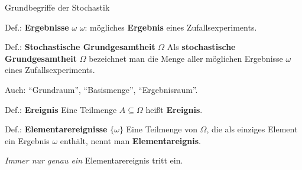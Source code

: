 \documentclass[
  10pt,
  ignorenonframetext,
]{beamer}
\begin{document}
\begin{frame}{Grundbegriffe der Stochastik}
\protect\hypertarget{grundbegriffe-der-stochastik}{}
\begin{block}{Def.: \textbf{Ergebnisse} \(\omega\)}
\protect\hypertarget{def.-ergebnisse-omega}{}
\(\omega\): mögliches \textbf{Ergebnis} eines Zufallsexperiments.
\end{block}

\begin{block}{Def.: \textbf{Stochastische Grundgesamtheit} \(\Omega\)}
\protect\hypertarget{def.-stochastische-grundgesamtheit-omega}{}
Als \textbf{stochastische Grundgesamtheit} \(\Omega\) bezeichnet man die
Menge aller möglichen Ergebnisse \(\omega\) eines Zufallsexperiments.
\end{block}

Auch: ``Grundraum'', ``Basismenge'', ``Ergebnisraum''.

\begin{block}{Def.: \textbf{Ereignis}}
\protect\hypertarget{def.-ereignis}{}
Eine Teilmenge \(A \subseteq \Omega\) heißt \textbf{Ereignis}.
\end{block}

\begin{block}{Def.: \textbf{Elementarereignisse} \(\{\omega\}\)}
\protect\hypertarget{def.-elementarereignisse-omega}{}
Eine Teilmenge von \(\Omega\), die als einziges Element ein Ergebnis
\(\omega\) enthält, nennt man \textbf{Elementareignis}.
\end{block}

\emph{Immer nur genau ein} Elementarereignis tritt ein.

\end{frame}
\end{document}
